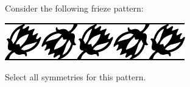 \documentclass{ximera}
\author{Bart Snapp}
\begin{document}
\begin{exercise}
  Consider the following frieze pattern:
  \begin{image}
  \includegraphics{fph5.pdf}
  \end{image}
  Select all symmetries for this pattern.
  \begin{selectAll}
  \end{selectAll}
\end{exercise}
\end{document}
